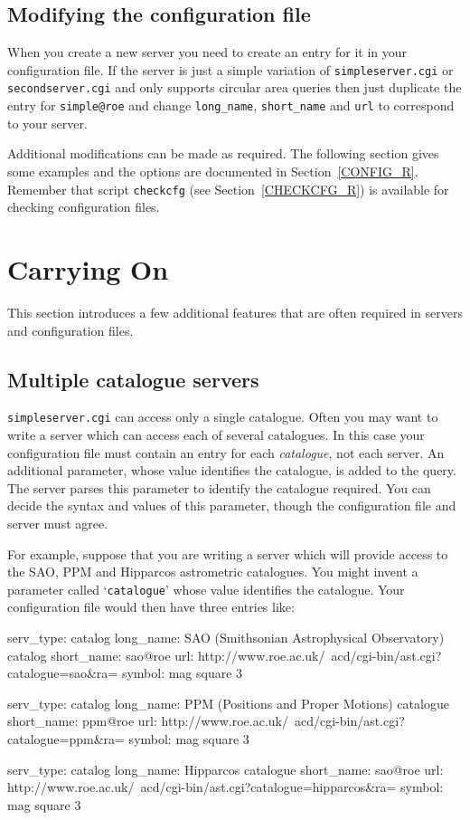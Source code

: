 \documentclass[twoside,11pt,nolof,chapters]{starlink}
\begin{document}
\subsection{Modifying the configuration file}

When you create a new server you need to create an entry for it in
your configuration file.  If the server is just a simple variation of
\texttt{simpleserver.cgi} or \texttt{secondserver.cgi} and only supports
circular area queries then just duplicate the entry for \texttt{simple@roe}
and change \texttt{long\_name}, \texttt{short\_name} and \texttt{url} to correspond
to your server.

Additional modifications can be made as required.  The following section
gives some examples and the options are documented in
Section~\ref{CONFIG_R}.  Remember that script \texttt{checkcfg} (see
Section~\ref{CHECKCFG_R}) is available for checking configuration files.


\section{\label{CARRYON_T}Carrying On}

This section introduces a few additional features that are often
required in servers and configuration files.

\subsection{Multiple catalogue servers}

\texttt{simpleserver.cgi} can access only a single catalogue.  Often you
may want to write a server which can access each of several catalogues.
In this case your configuration file must contain an entry for each
\textit{catalogue}, not each server.  An additional parameter, whose value
identifies the catalogue, is added to the query.  The server parses this
parameter to identify the catalogue required.  You can decide the
syntax and values of this parameter, though the configuration file and
server must agree.

For example, suppose that you are writing a server which will provide
access to the SAO, PPM and Hipparcos astrometric catalogues.  You might
invent a parameter called `\texttt{catalogue}' whose value identifies the
catalogue.  Your configuration file would then have three entries like:

{\small
\begin{terminalv}
serv_type:  catalog
long_name:  SAO (Smithsonian Astrophysical Observatory) catalog
short_name: sao@roe
url:        http://www.roe.ac.uk/~acd/cgi-bin/ast.cgi?catalogue=sao&ra=%
symbol:     mag square 3

serv_type:  catalog
long_name:  PPM (Positions and Proper Motions) catalogue
short_name: ppm@roe
url:        http://www.roe.ac.uk/~acd/cgi-bin/ast.cgi?catalogue=ppm&ra=%
symbol:     mag square 3

serv_type:  catalog
long_name:  Hipparcos catalogue
short_name: sao@roe
url:        http://www.roe.ac.uk/~acd/cgi-bin/ast.cgi?catalogue=hipparcos&ra=%
symbol:     mag square 3
\end{terminalv}
}
\end{document}
